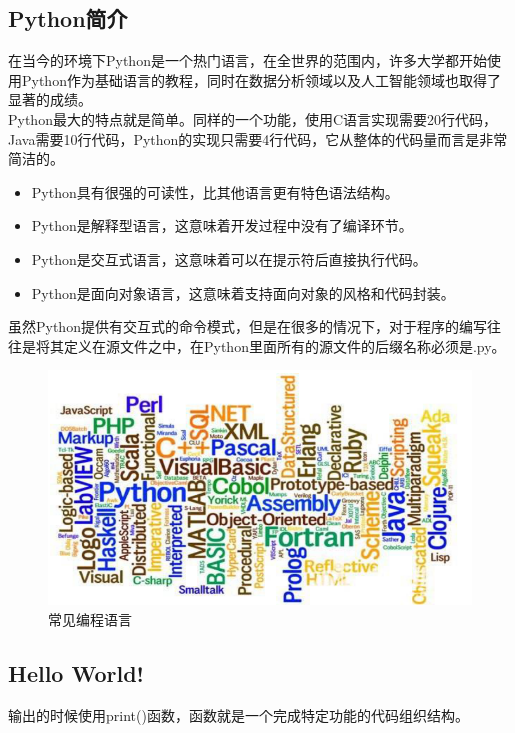 \subsection{Python简介}

在当今的环境下Python是一个热门语言，在全世界的范围内，许多大学都开始使用Python作为基础语言的教程，同时在数据分析领域以及人工智能领域也取得了显著的成绩。 \\

Python最大的特点就是简单。同样的一个功能，使用C语言实现需要20行代码，Java需要10行代码，Python的实现只需要4行代码，它从整体的代码量而言是非常简洁的。

\begin{itemize}
	\item Python具有很强的可读性，比其他语言更有特色语法结构。
	\item Python是解释型语言，这意味着开发过程中没有了编译环节。
	\item Python是交互式语言，这意味着可以在提示符后直接执行代码。
	\item Python是面向对象语言，这意味着支持面向对象的风格和代码封装。
\end{itemize}

虽然Python提供有交互式的命令模式，但是在很多的情况下，对于程序的编写往往是将其定义在源文件之中，在Python里面所有的源文件的后缀名称必须是.py。

\begin{figure}[H]
	\centering
	\includegraphics[scale=0.9]{img/C1/1-1/1.png}
	\caption{常见编程语言}
\end{figure}

\subsection{Hello World!}

输出的时候使用print()函数，函数就是一个完成特定功能的代码组织结构。 \\

